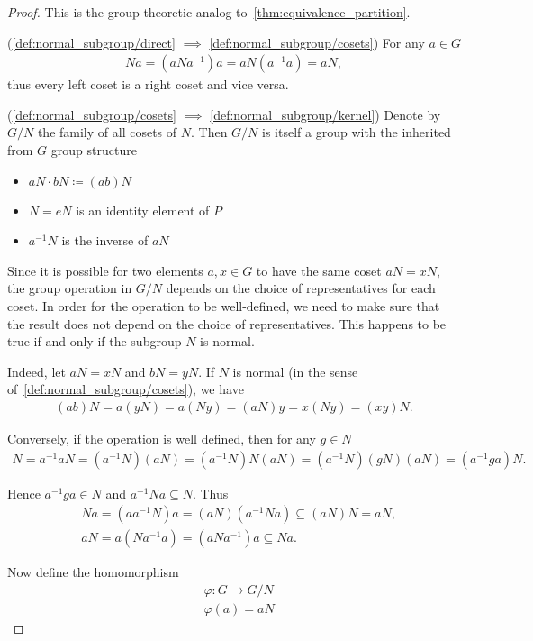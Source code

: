 \begin{proof}
  This is the group-theoretic analog to~\cref{thm:equivalence_partition}.

  (\ref{def:normal_subgroup/direct} $\implies$ \ref{def:normal_subgroup/cosets}) For any $a \in G$
  \begin{align*}
    Na = (aNa^{-1})a = aN(a^{-1}a) = aN,
  \end{align*}
  thus every left coset is a right coset and vice versa.

  (\ref{def:normal_subgroup/cosets} $\implies$ \ref{def:normal_subgroup/kernel}) Denote by $G / N$ the family of all cosets of $N$. Then $G / N$ is itself a group with the inherited from $G$ group structure
  \begin{itemize}
    \item $aN \cdot bN \coloneqq (ab)N$
    \item $N = eN$ is an identity element of $P$
    \item $a^{-1} N$ is the inverse of $aN$
  \end{itemize}

  Since it is possible for two elements $a, x \in G$ to have the same coset $aN = xN$, the group operation in $G / N$ depends on the choice of representatives for each coset. In order for the operation to be well-defined, we need to make sure that the result does not depend on the choice of representatives. This happens to be true if and only if the subgroup $N$ is normal.

  Indeed, let $aN = xN$ and $bN = yN$. If $N$ is normal (in the sense of~\ref{def:normal_subgroup/cosets}), we have
  \begin{align*}
    (ab)N = a(yN) = a(Ny) = (aN)y = x(Ny) = (xy)N.
  \end{align*}

  Conversely, if the operation is well defined, then for any $g \in N$
  \begin{align*}
    N = a^{-1} a N = (a^{-1} N) (a N) = (a^{-1} N) N (a N) = (a^{-1} N) (g N) (a N) = (a^{-1} g a) N.
  \end{align*}

  Hence $a^{-1} g a \in N$ and $a^{-1} N a \subseteq N$. Thus
  \begin{align*}
    &Na = (a a^{-1} N)a = (aN) (a^{-1} N a) \subseteq (aN) N = aN,
    \\
    &aN = a(N a^{-1} a) = (a N a^{-1}) a \subseteq Na.
  \end{align*}

  Now define the homomorphism
  \begin{align*}
    &\varphi: G \to G / N \\
    &\varphi(a) = aN
  \end{align*}


\end{proof}

